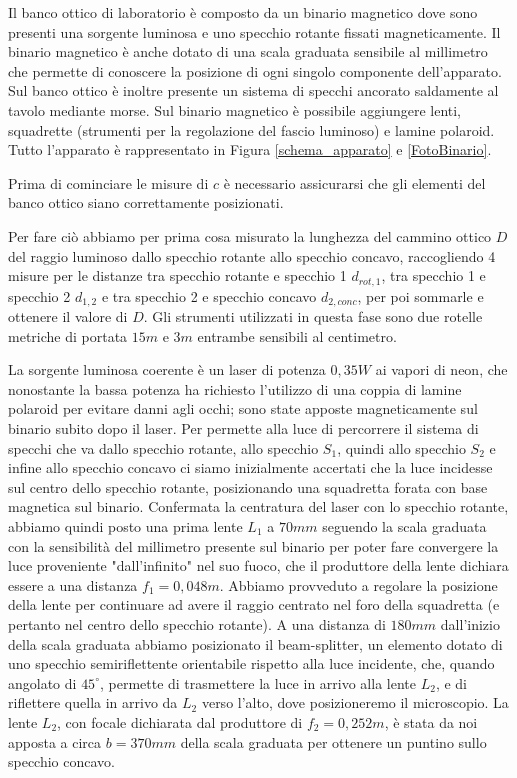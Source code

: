 \documentclass{article}
\begin{document}
Il banco ottico di laboratorio è composto da un binario magnetico dove sono presenti una sorgente luminosa e uno specchio rotante fissati magneticamente. Il binario magnetico
è anche dotato di una scala graduata sensibile al millimetro che permette di conoscere la posizione di ogni singolo componente dell'apparato. Sul banco ottico è inoltre 
presente un sistema di specchi ancorato saldamente al tavolo mediante morse. Sul binario magnetico è possibile aggiungere lenti, squadrette (strumenti per la 
regolazione del fascio luminoso) e lamine polaroid. Tutto l'apparato è rappresentato in Figura \ref{schema_apparato} e \ref{FotoBinario}.

Prima di cominciare le misure di $c$ è necessario assicurarsi che gli elementi del banco ottico siano correttamente posizionati.

\vspace{3mm}

Per fare ciò abbiamo per prima cosa misurato la lunghezza del cammino ottico $D$ del raggio luminoso dallo specchio rotante allo specchio concavo, raccogliendo 
4 misure per le distanze tra specchio rotante e specchio 1 $d_{rot,1}$, tra specchio 1 e specchio 2 $d_{1,2}$ e tra specchio 2 e specchio concavo $d_{2,conc}$, per poi 
sommarle e ottenere il valore di $D$. Gli strumenti utilizzati in questa fase sono due rotelle metriche di portata $15m$ e $3m$ entrambe sensibili al centimetro.

\vspace{3mm}
La sorgente luminosa coerente è un laser di potenza $0,35W$ ai vapori di neon, che nonostante la bassa potenza ha richiesto l'utilizzo di una coppia di lamine polaroid per evitare danni agli
occhi; sono state apposte magneticamente sul binario subito dopo il laser.
Per permette alla luce di percorrere il sistema di specchi che va dallo specchio rotante, allo specchio $S_1$, quindi allo specchio $S_2$ e infine allo specchio concavo 
ci siamo inizialmente accertati che la luce incidesse sul centro dello specchio rotante, posizionando una squadretta forata con base magnetica sul binario.
Confermata la centratura del laser con lo specchio rotante, abbiamo quindi posto una prima lente $L_1$ a $70 mm$ seguendo la scala graduata con la sensibilità del 
millimetro presente sul binario per poter fare convergere la luce proveniente "dall'infinito" nel suo fuoco, che il produttore 
della lente dichiara essere a una distanza $f_1 = 0,048 m$. Abbiamo provveduto a regolare la posizione della lente per continuare ad avere il raggio centrato nel foro
della squadretta (e pertanto nel centro dello specchio rotante). A una distanza di $180mm$ dall'inizio della scala graduata abbiamo posizionato il beam-splitter, un elemento dotato di uno
specchio semiriflettente orientabile rispetto alla luce incidente, che, quando angolato di $45^\circ$, permette di trasmettere la luce in arrivo alla lente $L_2$, e di riflettere quella in arrivo da 
$L_2$ verso l'alto, dove posizioneremo il microscopio. La lente $L_2$, con focale dichiarata dal produttore di $f_2=0,252m$, è stata da noi 
apposta a circa $b = 370mm$ della scala graduata per ottenere un puntino sullo specchio concavo. 
\end{document}
